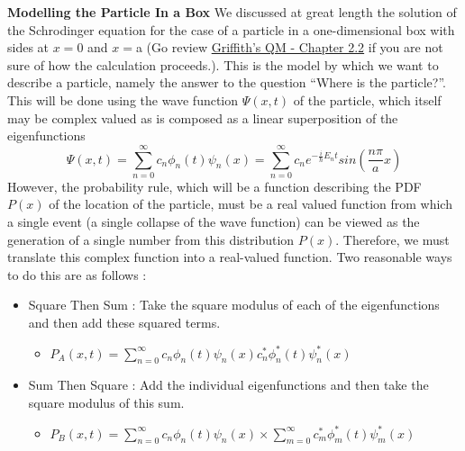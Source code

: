 \newpage
\textbf{Modelling the Particle In a Box} 
\newline
We discussed at great length the solution of the Schrodinger equation for the case of a particle in a one-dimensional box with sides at $x=$0 and $x=$a (Go review \href{http://www.fisica.net/mecanica-quantica/Griffiths\%20-\%20Introduction\%20to\%20quantum\%20mechanics.pdf}{Griffith's QM - Chapter 2.2} if you are not sure of how the calculation proceeds.).  This is the model by which we want to describe a particle, namely the answer to the question ``Where is the particle?''.  This will be done using the wave function $\Psi(x,t)$ of the particle, which itself may be complex valued as is composed as a linear superposition of the eigenfunctions 
\begin{displaymath}
 \Psi(x,t)=\displaystyle\sum_{n=0}^{\infty} c_{n}  \phi_{n}(t)  \psi_{n}(x) = \displaystyle\sum_{n=0}^{\infty} c_{n}  e^{-\frac{i}{\hbar}E_{n}t} sin(\frac{n\pi}{a}x)
\end{displaymath}
However, the probability rule, which will be a function describing the PDF $P(x)$ of the location of the particle, must be a real valued function from which a single event (a single collapse of the wave function) can be viewed as the generation of a single number from this distribution $P(x)$.  Therefore, we must translate this complex function into a real-valued function.  Two reasonable ways to do this are as follows :
\begin{itemize}
\item Square Then Sum : Take the square modulus of each of the eigenfunctions and then add these squared terms.
   \begin{itemize}
     \item $P_{A}(x,t)=\displaystyle\sum_{n=0}^{\infty}  c_{n}  \phi_{n}(t)  \psi_{n}(x) c_{n}^{*}  \phi_{n}^{*}(t)  \psi_{n}^{*}(x) $
   \end{itemize}
\item Sum Then Square : Add the individual eigenfunctions and then take the square modulus of this sum.
   \begin{itemize}
     \item $P_{B}(x,t)=\displaystyle\sum_{n=0}^{\infty}  c_{n}  \phi_{n}(t)  \psi_{n}(x) \times \displaystyle\sum_{m=0}^{\infty}  c_{m}^{*}  \phi_{m}^{*}(t)  \psi_{m}^{*}(x)$
   \end{itemize}
\end{itemize}


